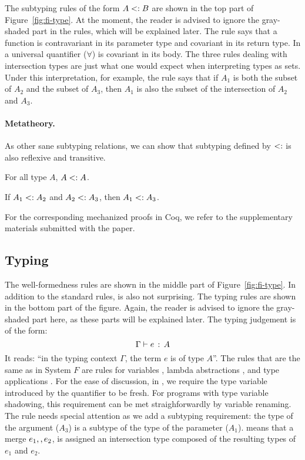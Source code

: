 The subtyping rules of the form $A <: B$ are shown in the top part of
Figure~\ref{fig:fi-type}. At the moment, the reader is advised to ignore the
gray-shaded part in the rules, which will be explained later. The rule
 says that a function is contravariant in its parameter
type and covariant in its return type. In  a universal
quantifier ($\forall$) is covariant in its body. The three rules dealing with
intersection types are just what one would expect when interpreting types as
sets. Under this interpretation, for example, the rule 
says that if $A_1$ is both the subset of $A_2$ and the subset of $A_3$, then
$A_1$ is also the subset of the intersection of $A_2$ and $A_3$.

\paragraph{Metatheory.} As other sane subtyping relations, we can show that
subtyping defined by $<:$ is also reflexive and transitive.

\begin{lemma} \label{lemma:sub-refl}
  For all type $ A $, $ A <: A $.
\end{lemma}

\begin{lemma} \label{lemma:sub-trans}
  If $ A_1 <: A_2 $ and $ A_2 <: A_3 $,
  then $ A_1 <: A_3 $.
\end{lemma}

For the corresponding mechanized proofs in Coq, we refer to the supplementary
materials submitted with the paper.

\subsection{Typing}

The well-formedness rules are shown in the middle part of
Figure~\ref{fig:fi-type}. In addition to the standard rules,
 is also not surprising. The typing rules are shown in
the bottom part of the figure. Again, the reader is advised to ignore the
gray-shaded part here, as these parts will be explained later. The typing judgement is
of the form: \[ \Gamma \vdash e \ \!:\! \ A \] It reads: ``in the typing context $\Gamma$,
the term $e$ is of type $A$''. The rules that are the same as in System $F$ are
rules for variables , lambda abstractions
, and type applications . For the
ease of discussion, in , we require the type variable
introduced by the quantifier to be fresh. For programs with type variable
shadowing, this requirement can be met straighforwardly by variable renaming.
The rule  needs special attention as we add a subtyping
requirement: the type of the argument ($A_3$) is a subtype of the type of the
parameter ($A_1$).  means that a merge $e_1 ,, e_2$,
is assigned an intersection type composed of the resulting types of
$e_1$ and $e_2$.

